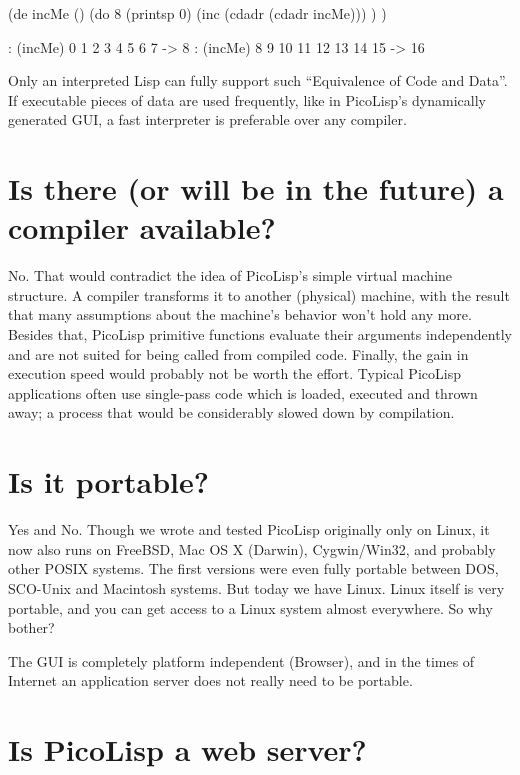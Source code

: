\begin{wideverbatim}
(de incMe ()
   (do 8
      (printsp 0)
      (inc (cdadr (cdadr incMe))) ) )

: (incMe)
0 1 2 3 4 5 6 7 -> 8
: (incMe)
8 9 10 11 12 13 14 15 -> 16
\end{wideverbatim}

Only an interpreted Lisp can fully support such ``Equivalence of Code and
Data''. If executable pieces of data are used frequently, like in
PicoLisp's dynamically generated GUI, a fast interpreter is preferable
over any compiler.

 
\section{Is there (or will be in the future) a compiler available?}
\label{sec:faq-is-there-(or-will-be-in-the-future)-a-compiler-available?}


No. That would contradict the idea of PicoLisp's simple virtual machine
structure. A compiler transforms it to another (physical) machine, with
the result that many assumptions about the machine's behavior won't hold
any more. Besides that, PicoLisp primitive functions evaluate their
arguments independently and are not suited for being called from
compiled code. Finally, the gain in execution speed would probably not
be worth the effort. Typical PicoLisp applications often use single-pass
code which is loaded, executed and thrown away; a process that would be
considerably slowed down by compilation.

 
\section{Is it portable?}
\label{sec:faq-is-it-portable?}


Yes and No. Though we wrote and tested PicoLisp originally only on
Linux, it now also runs on FreeBSD, Mac OS X (Darwin), Cygwin/Win32, and
probably other POSIX systems. The first versions were even fully
portable between DOS, SCO-Unix and Macintosh systems. But today we have
Linux. Linux itself is very portable, and you can get access to a Linux
system almost everywhere. So why bother?

The GUI is completely platform independent (Browser), and in the times
of Internet an application server does not really need to be portable.

 
\section{Is PicoLisp a web server?}
\label{sec:faq-is-picolisp-a-web-server?}


